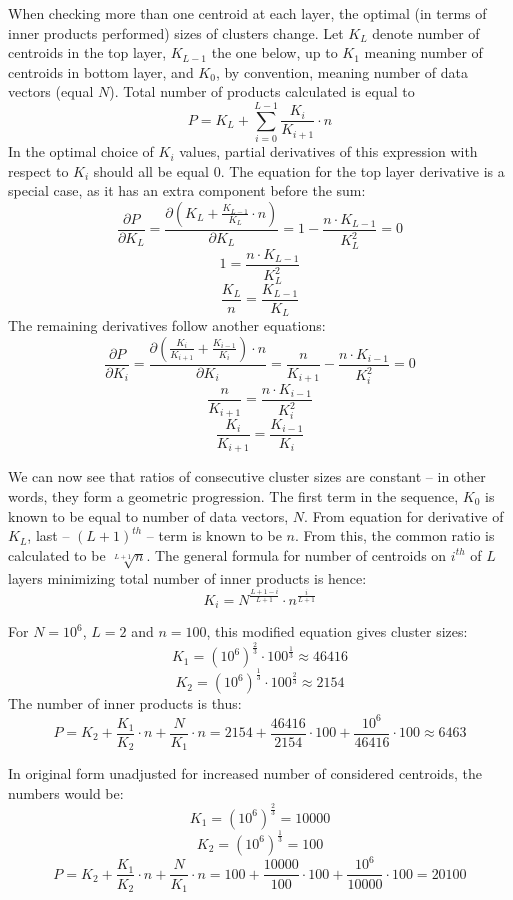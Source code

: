 When checking more than one centroid at each layer, the optimal (in terms
of inner products performed) sizes of clusters change. Let $ K_L $ denote
number of centroids in the top layer, $ K_{L-1} $ the one below, up to
$ K_1 $ meaning number of centroids in bottom layer, and $ K_0 $, by 
convention, meaning number of data vectors (equal $N$). Total number of
products calculated is equal to 
$$ P = K_L + \sum_{i=0}^{L-1} \frac{K_i}{K_{i+1}} \cdot n $$
In the optimal choice of $K_i$ values, partial derivatives of this expression
with respect to $K_i$ should all be equal 0. The equation for the top layer 
derivative is a special case, as it has an extra component before the sum:
$$ 
\frac{\partial P}{\partial K_L} = 
\frac{\partial (K_L + \frac{K_{L-1}}{K_L} \cdot n)}{\partial K_L} =
1 -\frac{n \cdot K_{L-1}}{K_L^2} = 
0
$$
$$
1 = \frac{n \cdot K_{L-1}}{K_L^2}
$$
$$
\frac{K_L}{n} = \frac{K_{L-1}}{K_L}
$$
The remaining derivatives follow another equations:
$$
\frac{\partial P}{\partial K_i} =
\frac{\partial (\frac{K_i}{K_{i+1}} + \frac{K_{i-1}}{K_i}) \cdot n}{\partial K_i} =
\frac{n}{K_{i+1}} - \frac{n \cdot K_{i-1}}{K_i^2} = 0
$$
$$
\frac{n}{K_{i+1}} = \frac{n \cdot K_{i-1}}{K_i^2}
$$
$$
\frac{K_i}{K_{i+1}} = \frac{K_{i-1}}{K_i}
$$

We can now see that ratios of consecutive cluster sizes are constant -- in other
words, they form a geometric progression. The first term in the sequence,
$K_0$ is known to be equal to number of data vectors, $N$. From equation
for derivative of $K_L$, last -- $(L+1)^{th}$ -- term is known to be $n$. From this,
the common ratio is calculated to be $\sqrt[L+1]{n}$. The general formula
for number of centroids on $i^{th}$ of $L$ layers minimizing total number of
inner products is hence:
$$
K_i = N^{\frac{L+1-i}{L+1}} \cdot n^\frac{i}{L+1}
$$

For $N = 10^6$, $L = 2$ and $n = 100$, this modified equation gives cluster sizes:
$$ K_1 = (10^6)^{\frac{2}{3}} \cdot 100^\frac{1}{3} \approx 46416 $$
$$ K_2 = (10^6)^{\frac{1}{3}} \cdot 100^\frac{2}{3} \approx 2154 $$
The number of inner products is thus:
$$ 
P = K_2 + \frac{K_1}{K_2} \cdot n + \frac{N}{K_1} \cdot n =
2154 + \frac{46416}{2154} \cdot 100 + \frac{10^6}{46416} \cdot 100 \approx
6463
$$

In original form unadjusted for increased number of considered centroids,
the numbers would be:
$$ K_1 = (10^6)^{\frac{2}{3}} = 10000 $$
$$ K_2 = (10^6)^{\frac{1}{3}} = 100 $$
$$ 
P = K_2 + \frac{K_1}{K_2} \cdot n + \frac{N}{K_1} \cdot n =
100 + \frac{10000}{100} \cdot 100 + \frac{10^6}{10000} \cdot 100 =
20100
$$

